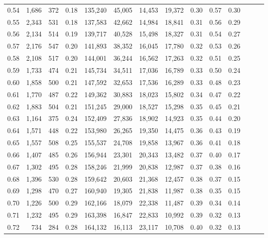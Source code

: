 \begin{tabular}{rrrrrrrrrrrrrr}
0.54 &  1,686 &  372 &  0.18 &  135,240 &   45,005 &  14,453 &  19,372 &  0.30 &  0.57 &      0.30 \\
0.55 &  2,343 &  531 &  0.18 &  137,583 &   42,662 &  14,984 &  18,841 &  0.31 &  0.56 &      0.29 \\
0.56 &  2,134 &  514 &  0.19 &  139,717 &   40,528 &  15,498 &  18,327 &  0.31 &  0.54 &      0.27 \\
0.57 &  2,176 &  547 &  0.20 &  141,893 &   38,352 &  16,045 &  17,780 &  0.32 &  0.53 &      0.26 \\
0.58 &  2,108 &  517 &  0.20 &  144,001 &   36,244 &  16,562 &  17,263 &  0.32 &  0.51 &      0.25 \\
0.59 &  1,733 &  474 &  0.21 &  145,734 &   34,511 &  17,036 &  16,789 &  0.33 &  0.50 &      0.24 \\
0.60 &  1,858 &  500 &  0.21 &  147,592 &   32,653 &  17,536 &  16,289 &  0.33 &  0.48 &      0.23 \\
0.61 &  1,770 &  487 &  0.22 &  149,362 &   30,883 &  18,023 &  15,802 &  0.34 &  0.47 &      0.22 \\
0.62 &  1,883 &  504 &  0.21 &  151,245 &   29,000 &  18,527 &  15,298 &  0.35 &  0.45 &      0.21 \\
0.63 &  1,164 &  375 &  0.24 &  152,409 &   27,836 &  18,902 &  14,923 &  0.35 &  0.44 &      0.20 \\
0.64 &  1,571 &  448 &  0.22 &  153,980 &   26,265 &  19,350 &  14,475 &  0.36 &  0.43 &      0.19 \\
0.65 &  1,557 &  508 &  0.25 &  155,537 &   24,708 &  19,858 &  13,967 &  0.36 &  0.41 &      0.18 \\
0.66 &  1,407 &  485 &  0.26 &  156,944 &   23,301 &  20,343 &  13,482 &  0.37 &  0.40 &      0.17 \\
0.67 &  1,302 &  495 &  0.28 &  158,246 &   21,999 &  20,838 &  12,987 &  0.37 &  0.38 &      0.16 \\
0.68 &  1,396 &  530 &  0.28 &  159,642 &   20,603 &  21,368 &  12,457 &  0.38 &  0.37 &      0.15 \\
0.69 &  1,298 &  470 &  0.27 &  160,940 &   19,305 &  21,838 &  11,987 &  0.38 &  0.35 &      0.15 \\
0.70 &  1,226 &  500 &  0.29 &  162,166 &   18,079 &  22,338 &  11,487 &  0.39 &  0.34 &      0.14 \\
0.71 &  1,232 &  495 &  0.29 &  163,398 &   16,847 &  22,833 &  10,992 &  0.39 &  0.32 &      0.13 \\
0.72 &    734 &  284 &  0.28 &  164,132 &   16,113 &  23,117 &  10,708 &  0.40 &  0.32 &      0.13 \\

\end{tabular}
